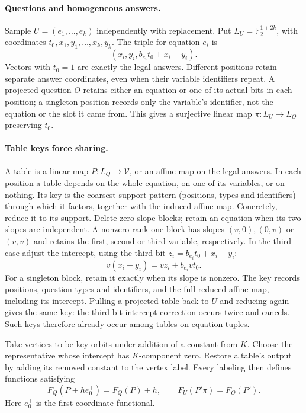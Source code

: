 \documentclass[11pt]{article}
\newcommand{\F}{\mathbb F}
\begin{document}
\paragraph{Questions and homogeneous answers.}
Sample $U=(e_1,\ldots,e_k)$ independently with replacement. Put
$L_U=\F_2^{1+2k}$, with coordinates $t_0,x_1,y_1,\ldots,x_k,y_k$.
The triple for equation $e_i$ is
\[
 (x_i,y_i,b_{e_i}t_0+x_i+y_i).
\]
Vectors with $t_0=1$ are exactly the legal answers. Different positions
retain separate answer coordinates, even when their variable identifiers
repeat. A projected question $O$ retains either an equation or one of its
actual bits in each position; a singleton position records only the
variable's identifier, not the equation or the slot it came from. This gives a surjective linear map
$\pi:L_U\to L_O$ preserving $t_0$.

\paragraph{Table keys force sharing.}
A table is a linear map $P:L_Q\to\mathcal V$, or an affine map on the
legal answers. In each position a table depends on the whole equation, on
one of its variables, or on nothing. Its key is the coarsest support
pattern (positions, types and identifiers) through which it factors,
together with the induced affine map.
Concretely, reduce it to its support. Delete zero-slope blocks; retain
an equation when its two slopes are independent. A nonzero rank-one block
has slopes $(v,0),(0,v)$ or $(v,v)$ and retains the first, second or third
variable, respectively. In the third case adjust the intercept, using the third bit
$z_i=b_{e_i}t_0+x_i+y_i$:
\[
 v(x_i+y_i)=v z_i+b_{e_i}v t_0.
\]
For a singleton block, retain it exactly when its slope is nonzero.
The key records positions, question types and identifiers, and the full
reduced affine map, including its intercept. Pulling a projected table
back to $U$ and reducing again gives the same key: the third-bit intercept
correction occurs twice and cancels. Such keys therefore already occur
among tables on equation tuples.

Take vertices to be key orbits under addition of a constant from $K$.
Choose the representative whose intercept has $K$-component zero. Restore
a table's output by adding its removed constant to the vertex label.
Every labeling then defines functions satisfying
\begin{equation}\label{eq:fold-share}
 F_Q(P+h e_0^\top)=F_Q(P)+h,\qquad
 F_U(P'\pi)=F_O(P').
\end{equation}
Here $e_0^\top$ is the first-coordinate functional.
\end{document}

